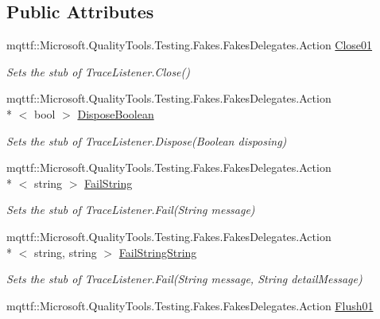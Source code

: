 \subsection*{Public Attributes}
\begin{DoxyCompactItemize}
\item 
mqttf\-::\-Microsoft.\-Quality\-Tools.\-Testing.\-Fakes.\-Fakes\-Delegates.\-Action \hyperlink{class_system_1_1_diagnostics_1_1_fakes_1_1_stub_trace_listener_a5d9002fb8d23819606a3136f99da13b5}{Close01}
\begin{DoxyCompactList}\small\item\em Sets the stub of Trace\-Listener.\-Close()\end{DoxyCompactList}\item 
mqttf\-::\-Microsoft.\-Quality\-Tools.\-Testing.\-Fakes.\-Fakes\-Delegates.\-Action\\*
$<$ bool $>$ \hyperlink{class_system_1_1_diagnostics_1_1_fakes_1_1_stub_trace_listener_af081e12ae67dc44d02d2b635c4497c7c}{Dispose\-Boolean}
\begin{DoxyCompactList}\small\item\em Sets the stub of Trace\-Listener.\-Dispose(\-Boolean disposing)\end{DoxyCompactList}\item 
mqttf\-::\-Microsoft.\-Quality\-Tools.\-Testing.\-Fakes.\-Fakes\-Delegates.\-Action\\*
$<$ string $>$ \hyperlink{class_system_1_1_diagnostics_1_1_fakes_1_1_stub_trace_listener_a18f23f049413e25e86946eb755d8435c}{Fail\-String}
\begin{DoxyCompactList}\small\item\em Sets the stub of Trace\-Listener.\-Fail(\-String message)\end{DoxyCompactList}\item 
mqttf\-::\-Microsoft.\-Quality\-Tools.\-Testing.\-Fakes.\-Fakes\-Delegates.\-Action\\*
$<$ string, string $>$ \hyperlink{class_system_1_1_diagnostics_1_1_fakes_1_1_stub_trace_listener_ae42dc4582c97a1355a14786cdd413fd9}{Fail\-String\-String}
\begin{DoxyCompactList}\small\item\em Sets the stub of Trace\-Listener.\-Fail(\-String message, String detail\-Message)\end{DoxyCompactList}\item 
mqttf\-::\-Microsoft.\-Quality\-Tools.\-Testing.\-Fakes.\-Fakes\-Delegates.\-Action \hyperlink{class_system_1_1_diagnostics_1_1_fakes_1_1_stub_trace_listener_a14b80e52c7f2b234770d58730f1a9f2d}{Flush01}

\end{DoxyCompactItemize}
